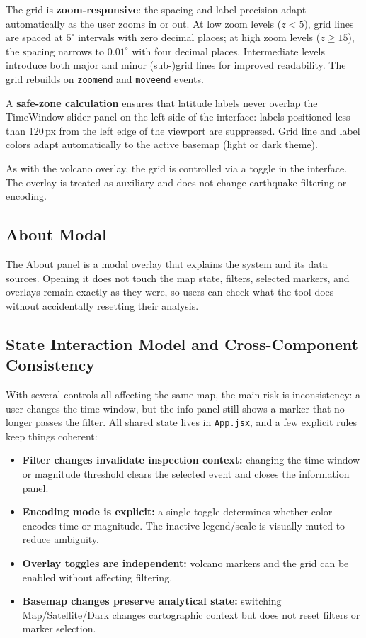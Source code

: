 \documentclass[12pt]{article}
\begin{document}
The grid is \textbf{zoom-responsive}: the spacing and label precision adapt automatically as the user zooms in or out. At low zoom levels ($z < 5$), grid lines are spaced at $5^{\circ}$ intervals with zero decimal places; at high zoom levels ($z \geq 15$), the spacing narrows to $0.01^{\circ}$ with four decimal places. Intermediate levels introduce both major and minor (sub-)grid lines for improved readability. The grid rebuilds on \texttt{zoomend} and \texttt{moveend} events.

A \textbf{safe-zone calculation} ensures that latitude labels never overlap the TimeWindow slider panel on the left side of the interface: labels positioned less than 120\,px from the left edge of the viewport are suppressed. Grid line and label colors adapt automatically to the active basemap (light or dark theme).

As with the volcano overlay, the grid is controlled via a toggle in the interface. The overlay is treated as auxiliary and does not change earthquake filtering or encoding.

\subsection{About Modal}
\label{subsec:frontend_about}

The About panel is a modal overlay that explains the system and its data sources. Opening it does not touch the map state, filters, selected markers, and overlays remain exactly as they were, so users can check what the tool does without accidentally resetting their analysis.

\subsection{State Interaction Model and Cross-Component Consistency}
\label{subsec:frontend_state_model}

With several controls all affecting the same map, the main risk is inconsistency: a user changes the time window, but the info panel still shows a marker that no longer passes the filter. All shared state lives in \texttt{App.jsx}, and a few explicit rules keep things coherent:

\begin{itemize}
    \item \textbf{Filter changes invalidate inspection context:} changing the time window or magnitude threshold clears the selected event and closes the information panel.
    \item \textbf{Encoding mode is explicit:} a single toggle determines whether color encodes time or magnitude. The inactive legend/scale is visually muted to reduce ambiguity.
    \item \textbf{Overlay toggles are independent:} volcano markers and the grid can be enabled without affecting filtering.
    \item \textbf{Basemap changes preserve analytical state:} switching Map/Satellite/Dark changes cartographic context but does not reset filters or marker selection.
\end{itemize}
\end{document}
